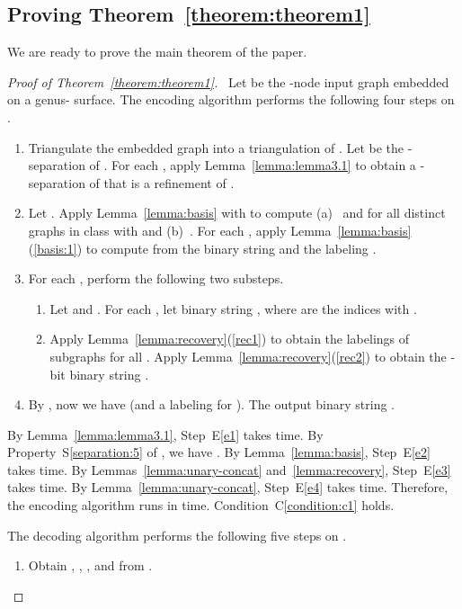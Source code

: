 \documentclass[12pt]{article}
\begin{document}
\subsection{Proving Theorem~\ref{theorem:theorem1}}
We are ready to prove the main theorem of the paper.
\begin{proof}[Proof of Theorem~\ref{theorem:theorem1}]\
Let  be the -node input graph embedded on a
genus- surface.  The encoding algorithm
 performs the following four steps on .
\begin{enumerate}[\em E1:]
\addtolength{\itemsep}{-0.5\baselineskip}

\item 
\label{e1}
Triangulate the embedded graph  into a triangulation  of
.  Let  be the -separation  of
. For each , apply Lemma~\ref{lemma:lemma3.1} to
obtain a -separation  of  that is a refinement of
.

\item 
\label{e2}
Let .  Apply Lemma~\ref{lemma:basis} with
 to compute
(a)~ and  for all distinct
graphs  in class  with  and
(b)~.  For each , apply
Lemma~\ref{lemma:basis}(\ref{basis:1}) to compute from
 the binary string
 and the labeling
.

\item 
\label{e3}
For each , perform the following two substeps.
\begin{enumerate}[\em E\ref{e3}.1:]
\item 
\label{encode:concat}
Let  and .  For
each , let binary string
, where  are the
indices  with .

\item 
Apply Lemma~\ref{lemma:recovery}(\ref{rec1}) to obtain the labelings
 of subgraphs  for all .  Apply
Lemma~\ref{lemma:recovery}(\ref{rec2}) to obtain the -bit binary
string .
\end{enumerate}

\item 
\label{e4}
By , now we have  (and a
labeling  for ).  The output binary string
.
\end{enumerate}
By Lemma~\ref{lemma:lemma3.1}, Step~E\ref{e1} takes  time.  By
Property~S\ref{separation:5} of , we have .  By Lemma~\ref{lemma:basis}, Step~E\ref{e2} takes
 time.  By Lemmas~\ref{lemma:unary-concat}
and~\ref{lemma:recovery}, Step~E\ref{e3} takes  time.  By
Lemma~\ref{lemma:unary-concat}, Step~E\ref{e4} takes  time.
Therefore, the encoding algorithm  runs in
 time. Condition~C\ref{condition:c1} holds.


\bigskip
\noindent
The decoding algorithm  performs the following five
steps on .
\begin{enumerate}[\em D1:]
\addtolength{\itemsep}{-0.5\baselineskip}
\item 
\label{d1}
Obtain , ,
, and  from .


\end{enumerate}
\end{proof}
\end{document}
